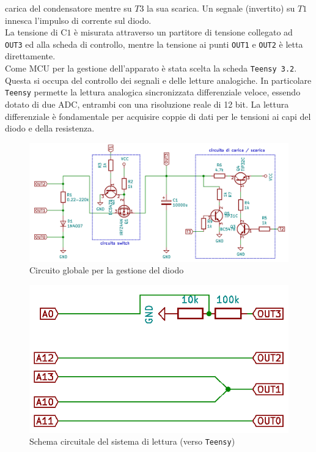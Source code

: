 \documentclass{article}[a4paper, oneside, 11pt]
\begin{document}
carica del condensatore mentre su $T3$ la sua scarica. Un segnale (invertito) 
su $T1$ innesca l'impulso di corrente sul diodo.\\
La tensione di C$1$ è misurata attraverso un partitore di tensione collegato 
ad \verb+OUT3+ ed alla scheda di controllo, mentre la tensione ai punti
\verb+OUT1+ e \verb+OUT2+ è letta direttamente.\\
Come MCU per la gestione dell'apparato è stata scelta la scheda 
\verb+Teensy 3.2+\cite{teensy}. Questa si occupa del controllo dei segnali e 
delle letture analogiche. In particolare \verb+Teensy+ permette la lettura
analogica sincronizzata differenziale veloce, essendo dotato di due ADC,
entrambi con una risoluzione reale di 12 bit. La lettura differenziale è
fondamentale per acquisire coppie di dati per le tensioni ai capi del diodo
e della resistenza.

\begin{figure}[H]%
	\centering 
 		\includegraphics[scale=0.5]{./gestione.png}
 	\caption{Circuito globale per la gestione del diodo \label{sch:gest}}
\end{figure}

\begin{figure}[H]
	\centering 
 		\includegraphics[scale=0.5]{./measure.png}
 	\caption{Schema circuitale del sistema di lettura (verso 
	\texttt{Teensy})
	\label{sch:rdng}}
\end{figure}
\end{document}
